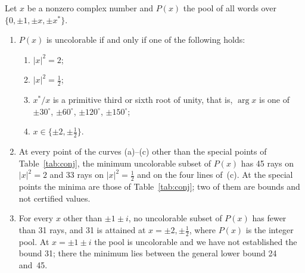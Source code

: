 \begin{theorem}\label{thm:conj}
Let $x$ be a nonzero complex number and $P(x)$ the pool of all words over
$\{0,\pm1,\pm x,\pm x^{*}\}$.
\begin{enumerate}[label=(\roman*)]
\item $P(x)$ is uncolorable if and only if one of the following holds:
\begin{enumerate}[label=(\alph*)]
\item $|x|^2=2$;
\item $|x|^2=\tfrac12$;
\item $x^{*}/x$ is a primitive third or sixth root of unity, that is, $\arg x$ is one of
$\pm30^\circ$, $\pm60^\circ$, $\pm120^\circ$, $\pm150^\circ$;
\item $x\in\{\pm2,\pm\tfrac12\}$.
\end{enumerate}
\item At every point of the curves (a)--(c) other than the special points of
Table~\ref{tab:conj}, the minimum uncolorable subset of $P(x)$ has 45 rays on $|x|^2=2$ and 33
rays on $|x|^2=\tfrac12$ and on the four lines of~(c).  At the special points the minima are
those of Table~\ref{tab:conj}; two of them are bounds and not certified values.
\item For every $x$ other than $\pm1\pm i$, no uncolorable subset of $P(x)$ has fewer than 31
rays, and 31 is attained at $x=\pm2,\pm\tfrac12$, where $P(x)$ is the integer pool.  At
$x=\pm1\pm i$ the pool is uncolorable and we have not established the bound 31; there the
minimum lies between the general lower bound 24 and~45.
\end{enumerate}
\end{theorem}

